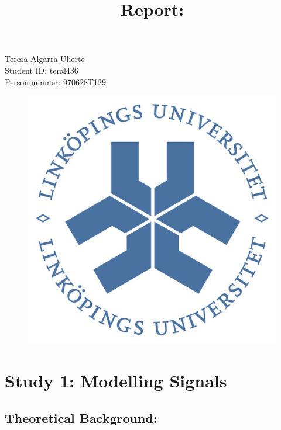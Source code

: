 \documentclass[a4paper,11pt]{article}
\title{\bfseries Report:\\}
\date{}
\begin{document}
\renewcommand\contentsname{\vspace{-1cm}}
\maketitle

\begin{centering}
    Teresa Algarra Ulierte \\
    Student ID: teral436 \\
    Personnummer: 970628T129 \\
\end{centering}

\vspace{1cm}

\begin{figure}[!ht]
	\centering
	\includegraphics[scale = 0.5]{images/portada.jpeg}
\end{figure}

\newpage

\section{Study 1: Modelling Signals}

\subsection{Theoretical Background:}
\end{document}
